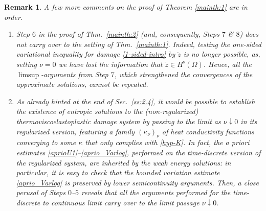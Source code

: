 \documentclass[a4paper,10pt,reqno]{amsart}
\numberwithin{equation}{section}
\numberwithin{equation}{section}
\newtheorem{remark}[theorem]{Remark}
\newcommand{\down}{\downarrow}
\newcommand{\condu}{\kappa}
\newcommand{\spz}{H^{\mathrm{s}}(\Omega)}
\begin{document}
\begin{remark}
\label{rmk:1-from-2}
\upshape
A few more comments on the proof of Theorem \ref{mainth:1} are in order.
\begin{enumerate}
\item Step $6$ in the proof of Thm.\ \ref{mainth:2} (and, consequently, Steps $7$ \& $8$) does not carry over to the setting of Thm.\ \ref{mainth:1}. Indeed, testing the one-sided variational inequality for damage \eqref{1-sided-intro} by $\dot{z}$ is no longer possible, as, setting $\nu=0$ we have lost the information that $\dot z \in \spz$. Hence, all the $\limsup$-arguments 
from Step $7$, which
strengthened the convergences of the approximate solutions, cannot be repeated. 
\item As already hinted at the end of Sec.\ \ref{ss:2.4}, it would be possible to establish the existence of entropic solutions to the (non-regularized) thermoviscoelastoplastic damage  system by passing to the limit as $\nu\down 0$ in its regularized version, featuring a family $(\condu_\nu)_\nu$ of heat conductivity functions converging to some $\condu$ that only complies with \eqref{hyp-K}. 
In fact,   the a priori estimates \eqref{aprioU1}--\eqref{aprio_Varlog}, performed on the time-discrete version of the regularized system, are inherited by the weak energy solutions: in particular, it is easy to check that the bounded variation estimate \eqref{aprio_Varlog}  is preserved by  lower semicontinuity arguments. Then,
a close perusal of Steps $0$--$5$ reveals that all the arguments performed for the time-discrete to continuous limit  carry over to the limit passage $\nu \downarrow 0$. 
\end{enumerate}
\end{remark}
\end{document}
